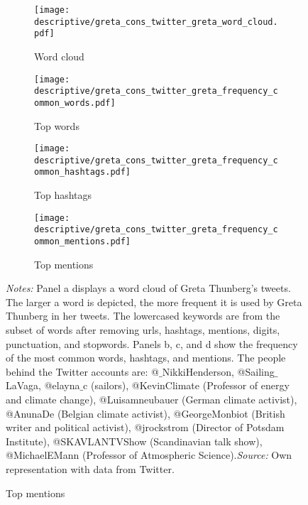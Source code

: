 


\begin{landscape}
	\vspace*{\fill}
	\begin{figure}[H]
		\centering
		\caption{Most widely used words, hashtags, and mentions in Greta Thunberg's 2019 tweets}
		\label{fig_greta_cons:twitter_greta_thunberg_top_words_hashtags_mentions}
		
		\begin{subfigure}[h]{0.4\linewidth}\centering\caption{Word cloud}
			\texttt{[image: descriptive/greta\_cons\_twitter\_greta\_word\_cloud.pdf]}
		\end{subfigure}
		\begin{subfigure}[h]{0.4\linewidth}\centering\caption{Top words}
			\texttt{[image: descriptive/greta\_cons\_twitter\_greta\_frequency\_common\_words.pdf]}
		\end{subfigure}
	
		\begin{subfigure}[h]{0.4\linewidth}\centering\caption{Top hashtags}
			\texttt{[image: descriptive/greta\_cons\_twitter\_greta\_frequency\_common\_hashtags.pdf]}
		\end{subfigure}
		\begin{subfigure}[h]{0.4\linewidth}\centering\caption{Top mentions}
			\texttt{[image: descriptive/greta\_cons\_twitter\_greta\_frequency\_common\_mentions.pdf]}
		\end{subfigure}
		\scriptsize
		\begin{minipage}{0.95\linewidth}
			\scriptsize{\emph{Notes:} Panel a displays a word cloud of Greta Thunberg's tweets. The larger a word is depicted, the more frequent it is used by Greta Thunberg in her tweets. The lowercased keywords are from the subset of words after removing urls, hashtags, mentions, digits, punctuation, and stopwords. Panels b, c, and d show the frequency of the most common words, hashtags, and mentions. The people behind the Twitter accounts are: @$\_$NikkiHenderson, @Sailing$\_$LaVaga, @elayna$\_$c (sailors), @KevinClimate (Professor of energy and climate change), @Luisamneubauer (German climate activist), @AnunaDe (Belgian climate activist), @GeorgeMonbiot (British writer and political activist), @jrockstrom (Director of Potsdam Institute), @SKAVLANTVShow (Scandinavian talk show), @MichaelEMann (Professor of Atmospheric Science).\newline\emph{Source:} Own representation with data from Twitter.}
		\end{minipage}
	\end{figure}
	\vspace*{\fill}\clearpage
\end{landscape}
